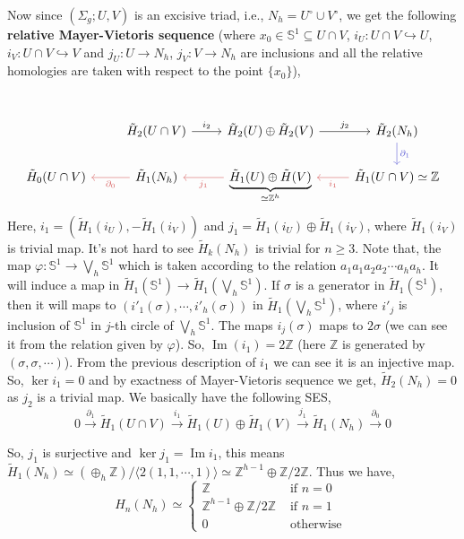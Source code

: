 \documentclass[11pt]{article}
\newcommand{\bb}[1]{\mathbb{#1}}
\newcommand{\Z}{\bb{Z}}
\newcommand{\s}{\bb{S}}
\newcommand{\p}{\partial}
\begin{document}
\noindent Now since $(\Sigma_g; U, V)$ is an excisive triad, i.e., $N_h = U^{\circ} \cup V^{\circ}$, we get the following \textbf{relative Mayer-Vietoris sequence} (where $x_0 \in \s^1 \subseteq U \cap V$, $i_U : U \cap V \hookrightarrow U$, $i_V : U \cap V \hookrightarrow V$ and $j_U : U \to N_h$, $j_V : V \to N_h$ are inclusions and all the relative homologies are taken with respect to the point $\{x_0\}$),
\[\begin{tikzcd}
	&& {} \\
	& {\tilde{H}_2(U \cap V)} & {\tilde{H}_2(U) \oplus \tilde{H}_2(V)} & {\tilde{H}_2(N_h)} \\
	{\tilde{H}_0(U \cap V)} & {\tilde{H}_1(N_h)} & {\underbrace{\tilde{H}_1(U)\oplus \tilde{H}(V)}_{\simeq \Z^{h}}} & {\tilde{H}_1(U \cap V) \simeq \Z}
	\arrow["{i_2}", from=2-2, to=2-3]
	\arrow["{j_2}", from=2-3, to=2-4]
	\arrow["{\p_{1}}", color={rgb,255:red,92;green,92;blue,214}, from=2-4, to=3-4]
	\arrow["{j_1}", color={rgb,255:red,214;green,92;blue,92}, from=3-3, to=3-2]
	\arrow["{i_1}", color={rgb,255:red,214;green,92;blue,92}, from=3-4, to=3-3]
	\arrow["{\p_0}", color={rgb,255:red,214;green,92;blue,92}, from=3-2, to=3-1]
\end{tikzcd}\]
Here, $i_1 = ( \tilde{H}_1(i_U), -\tilde{H}_1(i_V))$ and $j_1 = \tilde{H}_1(i_U) \oplus \tilde{H}_1(i_V)$, where $\tilde{H}_1(i_V)$ is trivial map. It's not hard to see $\tilde{H}_k(N_h)$ is trivial for $n \geq 3$. Note that, the map $\varphi :\s^1 \to \bigvee_{h}\s^1$ which is taken according to the relation $a_1a_1a_2a_2\cdots a_ha_h$. It will induce a map in $\tilde{H}_1(\s^1) \to  \tilde{H}_1(\bigvee_{h}\s^1)$. If $\sigma$ is a generator in $\tilde{H}_1(\s^1)$, then it will maps to $(i'_1(\sigma), \cdots ,i'_{h}(\sigma))$ in $\tilde{H}_1(\bigvee_{h}\s^1)$, where $i'_j$ is inclusion of $\s^1$ in $j$-th circle of $\bigvee_{h}\s^1$. The maps $i_j(\sigma)$ maps to $2\sigma$ (we can see it from the relation given by $\varphi$). So, $\operatorname{Im}(i_1)= 2\Z$ (here $\Z$ is generated by $(\sigma,\sigma,\cdots)$). From the previous description of $i_1$ we can see it is an injective map. So, $\ker i_1 =0$ and by exactness of Mayer-Vietoris sequence we get, $\tilde{H}_2(N_h)= 0$ as $j_2$ is a trivial map. We basically have the following SES,  $$0 \xrightarrow{\p_1} \tilde{H}_1(U \cap V) \xrightarrow{i_1} \tilde{H}_1(U)\oplus \tilde{H}_1(V) \xrightarrow{j_1}\tilde{H}_1(N_h) \xrightarrow{\p_0} 0$$

\noindent So, $j_1$ is surjective and $\ker j_1 = \operatorname{Im} i_1$, this means $\tilde{H}_1(N_h) \simeq (\oplus_h\Z)/\langle 2(1,1,\cdots,1)\rangle \simeq \Z^{h-1} \oplus \Z/2\Z$. Thus we have, 
$$H_n(N_h) \simeq \begin{cases}
  \Z & \text{ if } n=0 \\
  \Z^{h-1} \oplus \Z/2\Z & \text{ if } n= 1\\
  0 & \text{ otherwise }
\end{cases}$$
\end{document}
